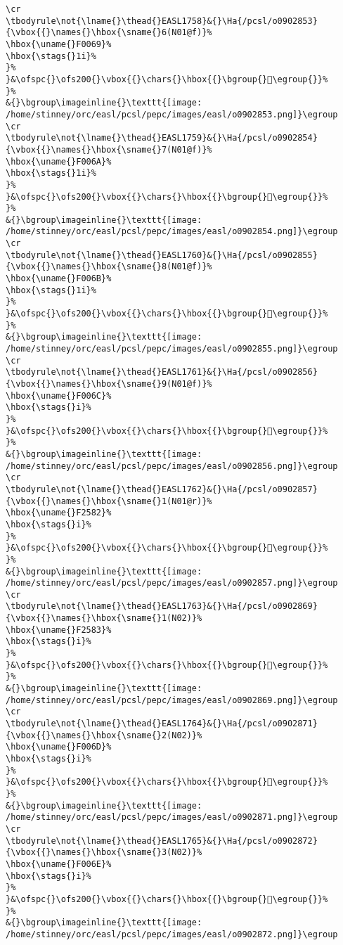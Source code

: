 \begin{verbatim}
\cr
\tbodyrule\not{\lname{}\thead{}EASL1758}&{}\Ha{/pcsl/o0902853}{\vbox{{}\names{}\hbox{\sname{}6(N01@f)}%
\hbox{\uname{}F0069}%
\hbox{\stags{}1i}%
}%
}&\ofspc{}\ofs200{}\vbox{{}\chars{}\hbox{{}\bgroup{}󰁩\egroup{}}%
}%
&{}\bgroup\imageinline{}\texttt{[image: /home/stinney/orc/easl/pcsl/pepc/images/easl/o0902853.png]}\egroup
\cr
\tbodyrule\not{\lname{}\thead{}EASL1759}&{}\Ha{/pcsl/o0902854}{\vbox{{}\names{}\hbox{\sname{}7(N01@f)}%
\hbox{\uname{}F006A}%
\hbox{\stags{}1i}%
}%
}&\ofspc{}\ofs200{}\vbox{{}\chars{}\hbox{{}\bgroup{}󰁪\egroup{}}%
}%
&{}\bgroup\imageinline{}\texttt{[image: /home/stinney/orc/easl/pcsl/pepc/images/easl/o0902854.png]}\egroup
\cr
\tbodyrule\not{\lname{}\thead{}EASL1760}&{}\Ha{/pcsl/o0902855}{\vbox{{}\names{}\hbox{\sname{}8(N01@f)}%
\hbox{\uname{}F006B}%
\hbox{\stags{}1i}%
}%
}&\ofspc{}\ofs200{}\vbox{{}\chars{}\hbox{{}\bgroup{}󰁫\egroup{}}%
}%
&{}\bgroup\imageinline{}\texttt{[image: /home/stinney/orc/easl/pcsl/pepc/images/easl/o0902855.png]}\egroup
\cr
\tbodyrule\not{\lname{}\thead{}EASL1761}&{}\Ha{/pcsl/o0902856}{\vbox{{}\names{}\hbox{\sname{}9(N01@f)}%
\hbox{\uname{}F006C}%
\hbox{\stags{}i}%
}%
}&\ofspc{}\ofs200{}\vbox{{}\chars{}\hbox{{}\bgroup{}󰁬\egroup{}}%
}%
&{}\bgroup\imageinline{}\texttt{[image: /home/stinney/orc/easl/pcsl/pepc/images/easl/o0902856.png]}\egroup
\cr
\tbodyrule\not{\lname{}\thead{}EASL1762}&{}\Ha{/pcsl/o0902857}{\vbox{{}\names{}\hbox{\sname{}1(N01@r)}%
\hbox{\uname{}F2582}%
\hbox{\stags{}i}%
}%
}&\ofspc{}\ofs200{}\vbox{{}\chars{}\hbox{{}\bgroup{}󲖂\egroup{}}%
}%
&{}\bgroup\imageinline{}\texttt{[image: /home/stinney/orc/easl/pcsl/pepc/images/easl/o0902857.png]}\egroup
\cr
\tbodyrule\not{\lname{}\thead{}EASL1763}&{}\Ha{/pcsl/o0902869}{\vbox{{}\names{}\hbox{\sname{}1(N02)}%
\hbox{\uname{}F2583}%
\hbox{\stags{}i}%
}%
}&\ofspc{}\ofs200{}\vbox{{}\chars{}\hbox{{}\bgroup{}󲖃\egroup{}}%
}%
&{}\bgroup\imageinline{}\texttt{[image: /home/stinney/orc/easl/pcsl/pepc/images/easl/o0902869.png]}\egroup
\cr
\tbodyrule\not{\lname{}\thead{}EASL1764}&{}\Ha{/pcsl/o0902871}{\vbox{{}\names{}\hbox{\sname{}2(N02)}%
\hbox{\uname{}F006D}%
\hbox{\stags{}i}%
}%
}&\ofspc{}\ofs200{}\vbox{{}\chars{}\hbox{{}\bgroup{}󰁭\egroup{}}%
}%
&{}\bgroup\imageinline{}\texttt{[image: /home/stinney/orc/easl/pcsl/pepc/images/easl/o0902871.png]}\egroup
\cr
\tbodyrule\not{\lname{}\thead{}EASL1765}&{}\Ha{/pcsl/o0902872}{\vbox{{}\names{}\hbox{\sname{}3(N02)}%
\hbox{\uname{}F006E}%
\hbox{\stags{}i}%
}%
}&\ofspc{}\ofs200{}\vbox{{}\chars{}\hbox{{}\bgroup{}󰁮\egroup{}}%
}%
&{}\bgroup\imageinline{}\texttt{[image: /home/stinney/orc/easl/pcsl/pepc/images/easl/o0902872.png]}\egroup

\end{verbatim}
